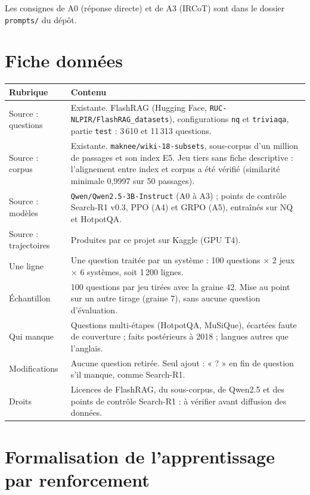 \documentclass[11pt,a4paper]{article}
\newif\iffictif
\begin{document}
\noindent Les consignes de A0 (réponse directe) et de A3 (IRCoT) sont dans le dossier \texttt{prompts/} du dépôt.

\section{Fiche données}\label{ann:fiche}

\begin{small}
\begin{longtable}{@{}p{3cm}p{11.6cm}@{}}
\toprule
Rubrique & Contenu\\
\midrule\endhead
Source : questions & Existante. FlashRAG (Hugging Face, \texttt{RUC-NLPIR/FlashRAG\_datasets}), configurations \texttt{nq} et \texttt{triviaqa}, partie \texttt{test} : 3\,610 et 11\,313 questions.\\
Source : corpus & Existante. \texttt{maknee/wiki-18-subsets}, sous-corpus d'un million de passages et son index E5. Jeu tiers sans fiche descriptive : l'alignement entre index et corpus a été vérifié (similarité minimale 0,9997 sur 50 passages).\\
Source : modèles & \texttt{Qwen/Qwen2.5-3B-Instruct} (A0 à A3) ; points de contrôle Search-R1 v0.3, PPO (A4) et GRPO (A5), entraînés sur NQ et HotpotQA.\\
Source : trajectoires & Produites par ce projet sur Kaggle (GPU T4). \iffictif\textcolor{red}{Dans cette version : fichiers fictifs, produits par \texttt{analysis/donnees\_fictives.py}.}\fi\\
Une ligne & Une question traitée par un système : 100 questions $\times$ 2 jeux $\times$ 6 systèmes, soit 1\,200 lignes.\\
Échantillon & 100 questions par jeu tirées avec la graine 42. Mise au point sur un autre tirage (graine 7), sans aucune question d'évaluation.\\
Qui manque & Questions multi-étapes (HotpotQA, MuSiQue), écartées faute de couverture ; faits postérieurs à 2018 ; langues autres que l'anglais.\\
Modifications & Aucune question retirée. Seul ajout : « ? » en fin de question s'il manque, comme Search-R1.\\
Droits & Licences de FlashRAG, du sous-corpus, de Qwen2.5 et des points de contrôle Search-R1 : à vérifier avant diffusion des données.\\
\bottomrule
\end{longtable}
\end{small}

\section{Formalisation de l'apprentissage par renforcement}\label{ann:formel}
\end{document}
